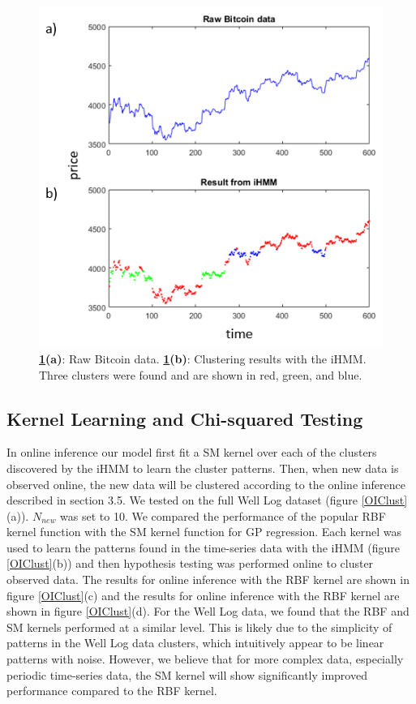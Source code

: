 \documentclass{article}
\begin{document}
\begin{figure}[ht]
\vskip 0.2in
\begin{center}
\centerline{\includegraphics[width=\columnwidth]{BTCClust}}
\caption{\textbf{\ref{BTCClust}(a)}: Raw Bitcoin data. \textbf{\ref{BTCClust}(b)}: Clustering results with the iHMM. Three clusters were found and are shown in red, green, and blue.}
\label{BTCClust}
\end{center}
\vskip -0.2in
\end{figure} 

\subsection{Kernel Learning and Chi-squared Testing}

In online inference our model first fit a SM kernel over each of the clusters discovered by the iHMM to learn the cluster patterns. Then, when new data is observed online, the new data will be clustered according to the online inference described in section 3.5. We tested on the full Well Log dataset (figure \ref{OIClust}(a)). $N_{new}$ was set to 10. We compared the performance of the popular RBF kernel function with the SM kernel function for GP regression. Each kernel was used to learn the patterns found in the time-series data with the iHMM (figure \ref{OIClust}(b)) and then hypothesis testing was performed online to cluster observed data. The results for online inference with the RBF kernel are shown in figure \ref{OIClust}(c) and the results for online inference with the RBF kernel are shown in figure \ref{OIClust}(d). For the Well Log data, we found that the RBF and SM kernels performed at a similar level. This is likely due to the simplicity of patterns in the Well Log data clusters, which intuitively appear to be linear patterns with noise. However, we believe that for more complex data, especially periodic time-series data, the SM kernel will show significantly improved performance compared to the RBF kernel. 
\end{document}
